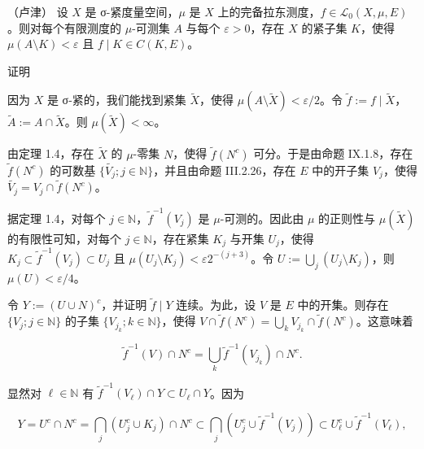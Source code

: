 \begin{theorem}

（卢津） 设 $ X $ 是 σ-紧度量空间，$ \mu $ 是 $ X $ 上的完备拉东测度，$ f \in \mathcal{L}_0(X,\mu,E) $。则对每个有限测度的 $ \mu $-可测集 $ A $ 与每个 $ \varepsilon > 0 $，存在 $ X $ 的紧子集 $ K $，使得 $ \mu(A\setminus K) < \varepsilon $ 且 $ f \mid K \in C(K,E) $。

证明

\begin{subitems}
\item

因为 $ X $ 是 σ-紧的，我们能找到紧集 $ \widetilde{X} $，使得 $ \mu(A\setminus \widetilde{X}) < \varepsilon/2 $。令 $ \widetilde{f} := f \mid \widetilde{X} $，$ \widetilde{A} := A \cap \widetilde{X} $。则 $ \mu(\widetilde{X}) < \infty $。

\item

由定理 1.4，存在 $ \widetilde{X} $ 的 $ \mu $-零集 $ N $，使得 $ \widetilde{f}(N^c) $ 可分。于是由命题 IX.1.8，存在 $ \widetilde{f}(N^c) $ 的可数基 $ \{ \widetilde{V_j} ; j \in \mathbb{N} \} $，并且由命题 III.2.26，存在 $ E $ 中的开子集 $ V_j $，使得 $ \widetilde{V_j} = V_j \cap \widetilde{f}(N^c) $。

\item

据定理 1.4，对每个 $ j \in \mathbb{N} $，$ \widetilde{f}^{-1}(V_j) $ 是 $ \mu $-可测的。因此由 $ \mu $ 的正则性与 $ \mu(\widetilde{X}) $ 的有限性可知，对每个 $ j \in \mathbb{N} $，存在紧集 $ K_j $ 与开集 $ U_j $，使得 $ K_j \subset \widetilde{f}^{-1}(V_j) \subset U_j $ 且 $ \mu(U_j \setminus K_j) < \varepsilon 2^{-(j+3)} $。令 $ U := \bigcup_j (U_j \setminus K_j) $，则 $ \mu(U) < \varepsilon/4 $。

\item

令 $ Y := (U \cup N)^c $，并证明 $ \widetilde{f} \mid Y $ 连续。为此，设 $ V $ 是 $ E $ 中的开集。则存在 $ \{ V_j ; j \in \mathbb{N} \} $ 的子集 $ \{ V_{j_k} ; k \in \mathbb{N} \} $，使得 $ V \cap \widetilde{f}(N^c) = \bigcup_k V_{j_k} \cap \widetilde{f}(N^c) $。这意味着

\[
\widetilde{f}^{-1}(V) \cap N^c = \bigcup_k \widetilde{f}^{-1}(V_{j_k}) \cap N^c .
\]

显然对 $ \ell \in \mathbb{N} $ 有 $ \widetilde{f}^{-1}(V_\ell) \cap Y \subset U_\ell \cap Y $。因为

\[
Y = U^c \cap N^c = \bigcap_j (U_j^c \cup K_j) \cap N^c \subset \bigcap_j (U_j^c \cup \widetilde{f}^{-1}(V_j)) \subset U_\ell^c \cup \widetilde{f}^{-1}(V_\ell) ,
\]


\end{subitems}
\end{theorem}
